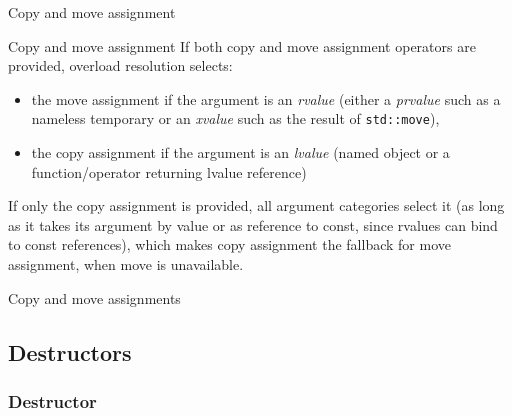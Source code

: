 \begin{frame}{Copy and move assignment}{}
  \begin{block}{Copy and move assignment}
    If both copy and move assignment operators are provided, overload resolution selects:
    \begin{itemize}
    \item
      the move assignment if the argument is an \emph{rvalue} (either a \emph{prvalue} such as a nameless temporary or an \emph{xvalue} such as the result of \lstinline!std::move!),
    \item
      the copy assignment if the argument is an \emph{lvalue} (named object or a function/operator returning lvalue reference)
    \end{itemize}
    If only the copy assignment is provided, all argument categories select it (as long as it takes its argument by value or as reference to const, since rvalues can bind to const references), which makes copy assignment the fallback for move assignment, when move is unavailable.
  \end{block}
\end{frame}

\begin{frame}{Copy and move assignments}{}
  \begin{example}
  \end{example}
\end{frame}


\subsection{Destructors}

\subsubsection{Destructor}

